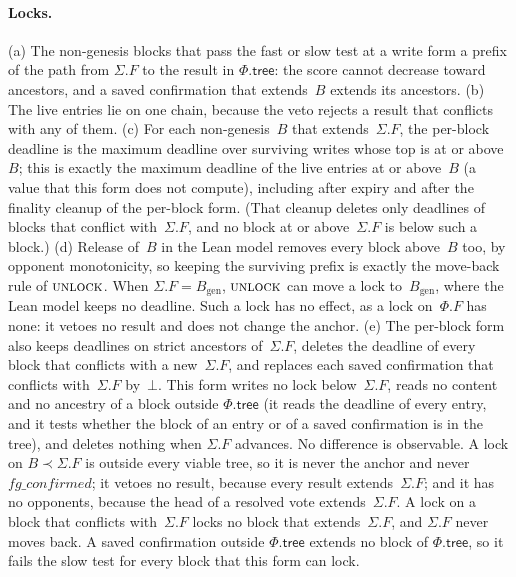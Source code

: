 \documentclass{article}
\newcommand{\genesis}{B_{\mathrm{gen}}}
\newcommand{\Fr}{\Phi}
\newcommand{\tree}{\mathsf{tree}}
\newcommand{\fname}[1]{\text{\textsc{#1}}}
\begin{document}
\paragraph{Locks.}
(a) The non-genesis blocks that pass the fast or slow test at a write form
a prefix of the path from $\Sigma.F$ to the result in $\Fr.\tree$: the score cannot decrease toward ancestors,
and a saved confirmation that extends~$B$ extends its ancestors.
(b) The live entries lie on one chain, because the veto rejects a result
that conflicts with any of them.
(c) For each non-genesis~$B$ that extends~$\Sigma.F$, the per-block
deadline is the maximum deadline over surviving writes whose top is at or
above~$B$; this is exactly the maximum deadline of the live entries at
or above~$B$ (a value that this form does not compute), including after expiry
and after the finality cleanup of the per-block form.  (That cleanup
deletes only deadlines of blocks that conflict with~$\Sigma.F$, and no
block at or above~$\Sigma.F$ is below such a block.)
(d) Release of~$B$ in the Lean model removes every block above~$B$ too, by opponent
monotonicity, so keeping the surviving prefix is exactly the move-back rule
of $\fname{unlock}$.  When $\Sigma.F=\genesis$, $\fname{unlock}$ can move
a lock to~$\genesis$, where the Lean model keeps no deadline.  Such a lock
has no effect, as a lock on~$\Fr.F$ has none: it vetoes no result and does
not change the anchor.
(e) The per-block form also keeps deadlines on strict ancestors
of~$\Sigma.F$, deletes the deadline of every block that conflicts with a
new~$\Sigma.F$, and replaces each saved confirmation that conflicts
with~$\Sigma.F$ by~$\bot$.  This form writes no lock below~$\Sigma.F$,
reads no content and no ancestry of a block outside $\Fr.\tree$ (it reads
the deadline of every entry, and it tests whether the block of an entry or
of a saved confirmation is in the tree), and deletes
nothing when $\Sigma.F$ advances.  No difference is observable.  A lock
on $B\prec\Sigma.F$ is outside every viable tree, so it is never the
anchor and never $\mathit{fg\_confirmed}$; it vetoes no result, because every
result extends~$\Sigma.F$; and it has no opponents, because the head of a
resolved vote extends~$\Sigma.F$.  A lock on a block that conflicts
with~$\Sigma.F$ locks no block that extends~$\Sigma.F$, and $\Sigma.F$
never moves back.  A saved confirmation outside $\Fr.\tree$ extends no
block of $\Fr.\tree$, so it fails the slow test for every block that this
form can lock.
\end{document}
